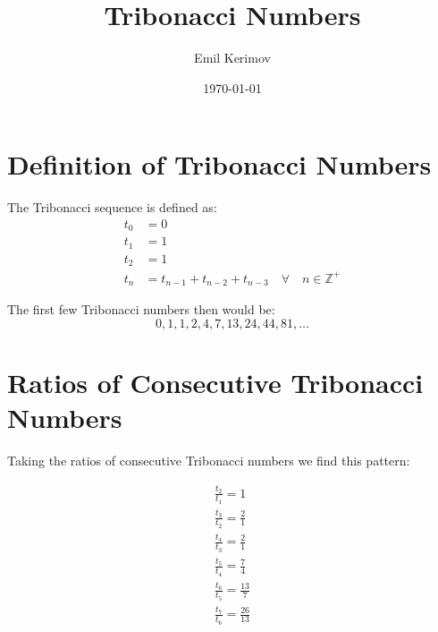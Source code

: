 \documentclass[a4paper]{article}
\title{Tribonacci Numbers}
\author{Emil Kerimov}
\date{\today}
\begin{document}
\maketitle



\section{Definition of Tribonacci Numbers}\label{trib:sec:definition}

The Tribonacci sequence is defined as:
\begin{equation}
\begin{aligned}
t_0 &= 0 \\
t_1 &= 1 \\
t_2 &= 1 \\
t_{n} &= t_{n-1} + t_{n-2} + t_{n-3} \quad \forall \quad n \in \mathbb{Z}^+
\end{aligned}\label{trib:eq:equation2}
\end{equation}

The first few Tribonacci numbers then would be:
\[
0,1,1,2,4,7,13,24,44, 81, \dots
\]

\section{Ratios of Consecutive Tribonacci Numbers}\label{trib:sec:basic_ratio}

Taking the ratios of consecutive Tribonacci numbers we find this pattern:

\begin{gather*}
\frac{t_{2}}{t_{1}} = 1 \\
\frac{t_{3}}{t_{2}} = \frac{2}{1}\\
\frac{t_{4}}{t_{3}} = \frac{2}{1}\\
\frac{t_{5}}{t_{4}} = \frac{7}{4}\\
\frac{t_{6}}{t_{5}} = \frac{13}{7}\\
\frac{t_{7}}{t_{6}} = \frac{26}{13}\\
\end{gather*}
\end{document}
